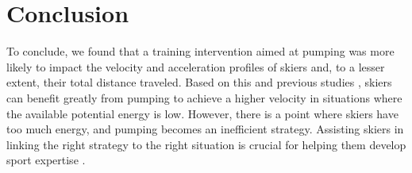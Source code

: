 \documentclass{article}
\begin{document}
\section{Conclusion}
To conclude, we found that a training intervention aimed at pumping was more likely to impact the velocity and acceleration profiles of skiers and, to a lesser extent, their total distance traveled. Based on this and previous studies \cite{christian_magelssen_reinforcement_2024}, skiers can benefit greatly from pumping to achieve a higher velocity in situations where the available potential energy is low. However, there is a point where skiers have too much energy, and pumping becomes an inefficient strategy. Assisting skiers in linking the right strategy to the right situation is crucial for helping them develop sport expertise \cite{krakauer_motor_2019}.








\end{document}
